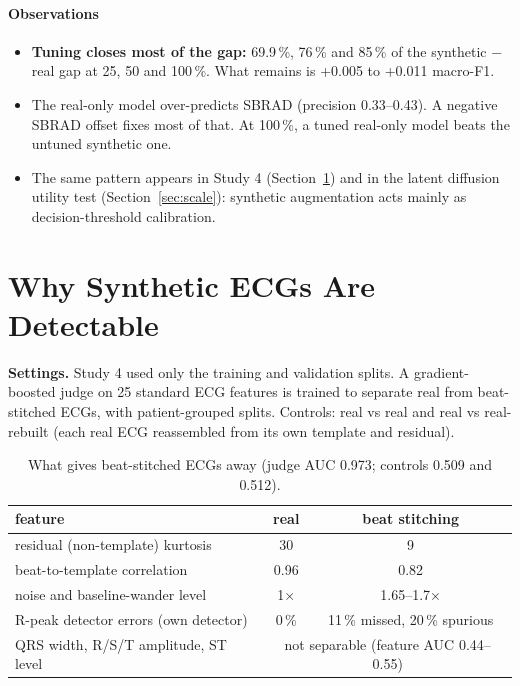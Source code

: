 \documentclass[11pt,a4paper]{article}
\newcommand{\obs}{\paragraph{Observations}}
\newcommand{\settings}[1]{\noindent\textbf{Settings.} #1\par\medskip}
\begin{document}
\obs
\begin{itemize}
\item \textbf{Tuning closes most of the gap:} 69.9\,\%, 76\,\% and 85\,\% of the synthetic $-$ real gap at 25, 50 and
  100\,\%. What remains is +0.005 to +0.011 macro-F1.
\item The real-only model over-predicts SBRAD (precision 0.33--0.43). A negative SBRAD offset fixes most of that. At
  100\,\%, a tuned real-only model beats the untuned synthetic one.
\item The same pattern appears in Study 4 (Section~\ref{sec:realism}) and in the latent diffusion utility test
  (Section~\ref{sec:scale}): synthetic augmentation acts mainly as decision-threshold calibration.
\end{itemize}

\section{Why Synthetic ECGs Are Detectable}\label{sec:realism}
\settings{Study 4 used only the training and validation splits. A gradient-boosted judge on 25 standard ECG features
is trained to separate real from beat-stitched ECGs, with patient-grouped splits. Controls: real vs real and real vs
real-rebuilt (each real ECG reassembled from its own template and residual).}

\begin{table}[H]\centering\small
\begin{tabular}{lcc}\toprule
feature & real & beat stitching \\\midrule
residual (non-template) kurtosis & 30 & 9 \\
beat-to-template correlation & 0.96 & 0.82 \\
noise and baseline-wander level & 1$\times$ & 1.65--1.7$\times$ \\
R-peak detector errors (own detector) & 0\,\% & 11\,\% missed, 20\,\% spurious \\
QRS width, R/S/T amplitude, ST level & \multicolumn{2}{c}{not separable (feature AUC 0.44--0.55)} \\\bottomrule
\end{tabular}
\caption{What gives beat-stitched ECGs away (judge AUC 0.973; controls 0.509 and 0.512).}
\end{table}
\end{document}
